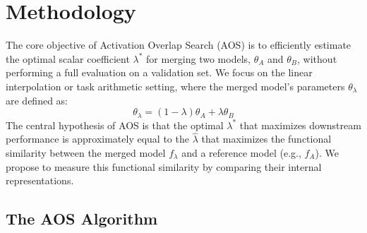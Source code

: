 \documentclass{article}
\theoremstyle{plain}
\theoremstyle{definition}
\theoremstyle{remark}
\begin{document}
\section{Methodology}

The core objective of Activation Overlap Search (AOS) is to efficiently estimate the optimal scalar coefficient $\lambda^*$ for merging two models, $\theta_A$ and $\theta_B$, without performing a full evaluation on a validation set. We focus on the linear interpolation or task arithmetic setting, where the merged model's parameters $\theta_\lambda$ are defined as:
\begin{equation}
\theta_\lambda = (1-\lambda)\theta_A + \lambda\theta_B
\end{equation}
The central hypothesis of AOS is that the optimal $\lambda^*$ that maximizes downstream performance is approximately equal to the $\hat{\lambda}$ that maximizes the functional similarity between the merged model $f_\lambda$ and a reference model (e.g., $f_A$). We propose to measure this functional similarity by comparing their internal representations.

\subsection{The AOS Algorithm}
\end{document}
